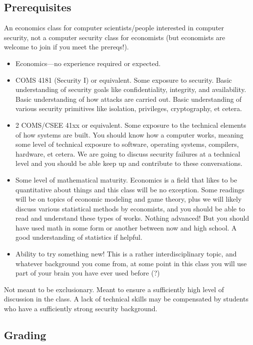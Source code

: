\documentclass[11pt]{article}
\begin{document}
\subsection{Prerequisites}

An economics class for computer scientists/people interested in computer security, not a computer security class for economists
(but economists are welcome to join if you meet the prereqs!).

\begin{itemize}
    \item Economics---no experience required or expected.
    \item COMS 4181 (Security I) or equivalent. Some exposure to security. Basic understanding of security goals like confidentiality, integrity, and availability. Basic understanding of how attacks are carried out. Basic understanding of various security primitives like isolation, privileges, cryptography, et cetera. 
    \item 2 COMS/CSEE 41xx or equivalent. Some exposure to the technical elements of how systems are built. You should know how a computer works, meaning some level of technical exposure to software, operating systems, compilers, hardware, et cetera. We are going to discuss security failures at a technical level and you should be able keep up and contribute to these conversations.
    \item Some level of mathematical maturity. Economics is a field that likes to be quantitative about things and this class will be no exception. Some readings will be on topics of economic modeling and game theory, plus we will likely discuss various statistical methods by economists, and you should be able to read and understand these types of works. Nothing advanced! But you should have used math in some form or another between now and high school. A good understanding of statistics if helpful.
    \item Ability to try something new! This is a rather interdisciplinary topic, and whatever background you come from, at some point in this class you will use part of your brain you have ever used before (?)
\end{itemize}

Not meant to be exclusionary. Meant to ensure a sufficiently high level of discussion in the class. 
A lack of technical skills may be compensated by students who have a sufficiently strong security background.


\subsection{Grading}
\end{document}
